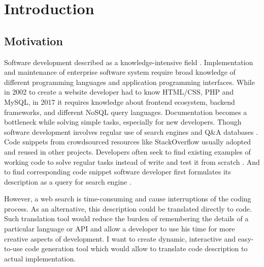 
\chapter{Introduction} %

\label{Chapter1} %


\newcommand{\keyword}[1]{\textbf{#1}}
\newcommand{\tabhead}[1]{\textbf{#1}}


\section{Motivation}
Software development described as a knowledge-intensive field \parencite{Robillard1999}. Implementation and maintenance of enterprise software system require broad knowledge of different programming languages and application programming interfaces. While in 2002 to create a website developer had to know HTML/CSS, PHP and MySQL, in 2017 it requires knowledge about frontend ecosystem, backend frameworks, and different NoSQL query languages. Documentation becomes a bottleneck while solving simple tasks, especially for new developers. Though software development involves regular use of search engines and Q\&A databases \parencite{Treude2011}. Code snippets from crowdsourced resources like StackOverflow usually adopted and reused in other projects. Developers often seek to find existing examples of working code to solve regular tasks instead of write and test it from scratch \parencite{Brandt2010}. And to find corresponding code snippet software developer first formulates its description as a query for search engine \parencite{Brandt2009}. 

However, a web search is time-consuming and cause interruptions of the coding process. As an alternative, this description could be translated directly to code. Such translation tool would reduce the burden of remembering the details of a particular language or API and allow a developer to use his time for more creative aspects of development. I want to create dynamic, interactive and easy-to-use code generation tool which would allow to translate code description to actual implementation. 

